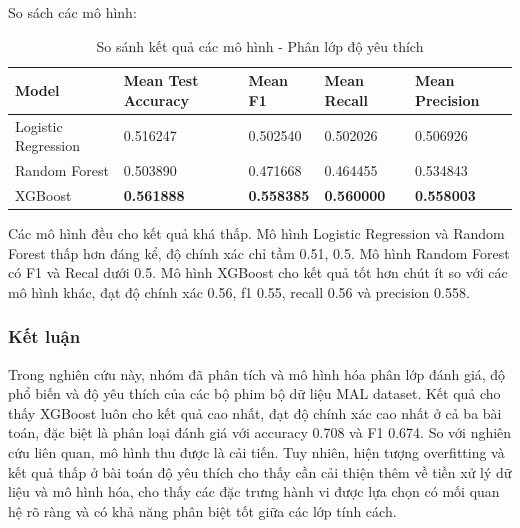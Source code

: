    So sách các mô hình:

    \begin{table}[htbp]
        \centering
        \caption{So sánh kết quả các mô hình - Phân lớp độ yêu thích}
        \label{tab:mal-fav-compare}
        \begin{tabular}{|p{2cm}|p{2cm}|p{2cm}|p{2cm}|p{2cm}|}
            \hline
             Model & Mean Test Accuracy & Mean F1 & Mean Recall & Mean Precision\\
            \hline
            Logistic Regression & 0.516247 & 0.502540 & 0.502026 & 0.506926 \\
            \hline
            Random Forest & 0.503890 & 0.471668 & 0.464455 & 0.534843 \\
            \hline
            XGBoost & \textbf{0.561888} & \textbf{0.558385} & \textbf{0.560000} & \textbf{0.558003} \\
            \hline
        \end{tabular}
    \end{table}

    \FloatBarrier

    Các mô hình đều cho kết quả khá thấp. Mô hình Logistic Regression và Random Forest thấp hơn đáng kể, độ chính xác chỉ tầm 0.51, 0.5. Mô hình Random Forest có F1 và Recal dưới 0.5. Mô hình XGBoost cho kết quả tốt hơn chút ít so với các mô hình khác, đạt độ chính xác 0.56, f1 0.55, recall 0.56 và precision 0.558. 

\subsubsection{Kết luận}
    Trong nghiên cứu này, nhóm đã phân tích và mô hình hóa phân lớp đánh giá, độ phổ biến và độ yêu thích của các bộ phim bộ dữ liệu MAL dataset. Kết quả cho thấy XGBoost luôn cho kết quả cao nhất, đạt độ chính xác cao nhất ở cả ba bài toán, đặc biệt là phân loại đánh giá với accuracy 0.708 và F1 0.674. So với nghiên cứu liên quan, mô hình thu được là cải tiến. Tuy nhiên, hiện tượng overfitting và kết quả thấp ở bài toán độ yêu thích cho thấy cần cải thiện thêm về tiền xử lý dữ liệu và mô hình hóa, cho thấy các đặc trưng hành vi được lựa chọn có mối quan hệ rõ ràng và có khả năng phân biệt tốt giữa các lớp tính cách.

